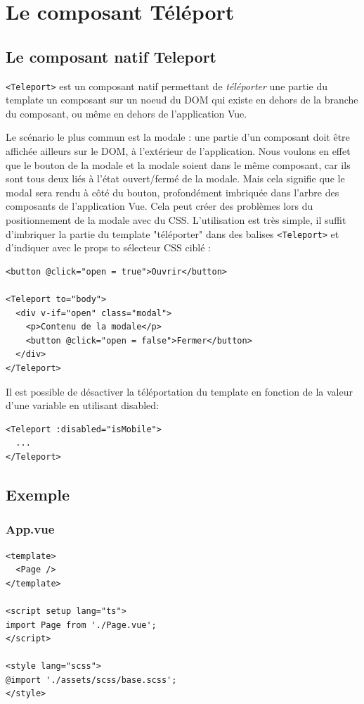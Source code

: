 \section{Le composant Téléport}
\subsection{Le composant natif {\color{monOrange}Teleport}}
{\tt <Teleport>} est un composant natif permettant de {\em téléporter} une partie du {\color{monOrange}template} un composant sur un noeud du {\color{monOrange}DOM} qui existe en dehors de la branche du composant, ou même en dehors de l'application {\color{monOrange}Vue}.

Le scénario le plus commun est la modale : une partie d'un composant doit être affichée ailleurs sur le {\color{monOrange}DOM}, à l'extérieur de l'application. Nous voulons en effet que le bouton de la modale et la modale soient dans le même composant, car ils sont tous deux liés à l'état ouvert/fermé de la modale. Mais cela signifie que le modal sera rendu à côté du bouton, profondément imbriquée dans l'arbre des composants de l'application {\color{monOrange}Vue}. Cela peut créer des problèmes lors du positionnement de la modale avec du {\color{monOrange}CSS}. L'utilisation est très simple, il suffit d'imbriquer la partie du {\color{monOrange}template} "téléporter" dans des balises {\tt <Teleport>} et d'indiquer avec le {\color{monOrange}props to} sélecteur {\color{monOrange}CSS} ciblé :
\begin{verbatim}
<button @click="open = true">Ouvrir</button>

<Teleport to="body">
  <div v-if="open" class="modal">
    <p>Contenu de la modale</p>
    <button @click="open = false">Fermer</button>
  </div>
</Teleport>
\end{verbatim}
Il est possible de désactiver la téléportation du {\color{monOrange}template} en fonction de la valeur d'une variable en utilisant {\color{monOrange}disabled}:
\begin{verbatim}
<Teleport :disabled="isMobile">
  ...
</Teleport>
\end{verbatim}
\subsection{Exemple}
\subsubsection*{App.vue}
\begin{verbatim}
<template>
  <Page />
</template>

<script setup lang="ts">
import Page from './Page.vue';
</script>

<style lang="scss">
@import './assets/scss/base.scss';
</style>
\end{verbatim}
